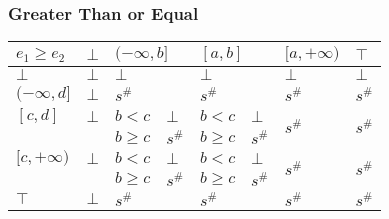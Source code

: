 \documentclass{beamer}
\begin{document}
        \begin{frame}
            \frametitle{Greater Than or Equal}
        \begin{table}
            \begin{tabular}{|l|l|ll|ll|l|l|}
            \hline
            $e_1 \ge e_2$  & $\bot$ & \multicolumn{2}{l|}{$(-\infty, b]$} & \multicolumn{2}{l|}{$[a, b]$} & $[a, +\infty)$          & $\top$                  \\ \hline
            $\bot$         & $\bot$ & \multicolumn{2}{l|}{$\bot$}         & \multicolumn{2}{l|}{$\bot$}   & $\bot$                  & $\bot$                  \\ \hline
            $(-\infty, d]$ & $\bot$ & \multicolumn{2}{l|}{$s^\#$}         & \multicolumn{2}{l|}{$s^\#$}   & $s^\#$                  & $s^\#$                  \\ \hline
            $[c, d]$       & $\bot$ & $b < c$            & $\bot$         & $b < c$         & $\bot$      & \multirow{2}{*}{$s^\#$} & \multirow{2}{*}{$s^\#$} \\
                            &        & $b \ge c$          & $s^\#$         & $b \ge c$       & $s^\#$      &                         &                         \\ \hline
            $[c, +\infty)$ & $\bot$ & $b < c$            & $\bot$         & $b < c$         & $\bot$      & \multirow{2}{*}{$s^\#$} & \multirow{2}{*}{$s^\#$} \\
                            &        & $b \ge c$          & $s^\#$         & $b \ge c$       & $s^\#$      &                         &                         \\ \hline
            $\top$         & $\bot$ & \multicolumn{2}{l|}{$s^\#$}         & \multicolumn{2}{l|}{$s^\#$}   & $s^\#$                  & $s^\#$                  \\ \hline
            \end{tabular}
            \end{table}
        \end{frame}
\end{document}
